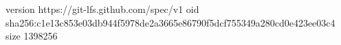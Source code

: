 version https://git-lfs.github.com/spec/v1
oid sha256:c1e13c853e03db944f5978de2a3665e86790f5dcf755349a280cd0e423ee03c4
size 1398256
